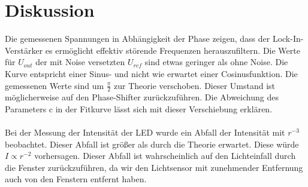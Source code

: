 \section{Diskussion}
\label{sec:Diskussion}

Die gemessenen Spannungen in Abhängigkeit der Phase zeigen, dass der Lock-In-Verstärker es ermöglicht effektiv 
störende Frequenzen herauszufiltern. Die Werte für $U_{out}$ der mit Noise versetzten $U_{ref}$ sind etwas geringer als ohne Noise.
Die Kurve entspricht einer Sinus- und nicht wie erwartet einer Cosinusfunktion. Die gemessenen Werte sind um 
$\frac{\pi}{2}$ zur Theorie verschoben. Dieser Umstand ist möglicherweise auf den Phase-Shifter zurückzuführen.
Die Abweichung des Parameters c in der Fitkurve lässt sich mit dieser Verschiebung erklären.\\
\\
Bei der Messung der Intensität der LED wurde ein Abfall der Intensität mit $r^{-3}$ beobachtet. Dieser Abfall ist 
größer als durch die Theorie erwartet. Diese würde $I \propto r^{-2}$ vorhersagen. Dieser Abfall ist wahrscheinlich auf den Lichteinfall 
durch die Fenster zurückzuführen, da wir den Lichtsensor mit zunehmender Entfernung auch von den Fenstern entfernt haben.\\
